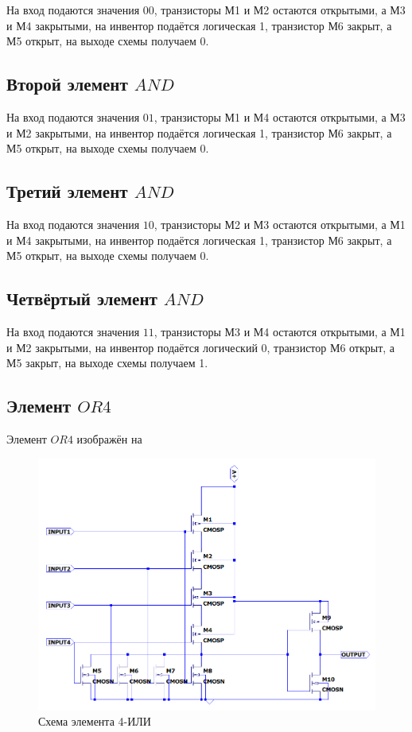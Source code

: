 \documentclass[a4paper,14pt]{article}
\begin{document}
На вход подаются значения $00$, транзисторы М1 и М2 остаются открытыми, а М3 и М4 закрытыми, на инвентор подаётся логическая 1, транзистор М6 закрыт, а М5 открыт, на выходе схемы получаем 0.

\subsection{Второй элемент $AND$}

На вход подаются значения $01$, транзисторы М1 и М4 остаются открытыми, а М3 и М2 закрытыми, на инвентор подаётся логическая 1, транзистор М6 закрыт, а М5 открыт, на выходе схемы получаем 0.

\subsection{Третий элемент $AND$}

На вход подаются значения $10$, транзисторы М2 и М3 остаются открытыми, а М1 и М4 закрытыми, на инвентор подаётся логическая 1, транзистор М6 закрыт, а М5 открыт, на выходе схемы получаем 0.

\subsection{Четвёртый элемент $AND$}

На вход подаются значения $11$, транзисторы М3 и М4 остаются открытыми, а М1 и М2 закрытыми, на инвентор подаётся логический 0, транзистор М6 открыт, а М5 закрыт, на выходе схемы получаем 1.

\subsection{Элемент $OR4$}

Элемент $OR4$ изображён на 

\begin{figure}[H]
	\centering		
	\includegraphics[width=\linewidth]{image/schema_or}
	\caption{Схема элемента 4-ИЛИ}\label{img:schema_or}
\end{figure}
\end{document}
